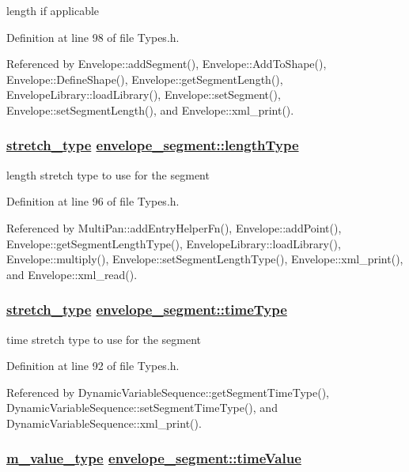 length if applicable 



Definition at line 98 of file Types.h.

Referenced by Envelope::add\-Segment(), Envelope::Add\-To\-Shape(), Envelope::Define\-Shape(), Envelope::get\-Segment\-Length(), Envelope\-Library::load\-Library(), Envelope::set\-Segment(), Envelope::set\-Segment\-Length(), and Envelope::xml\_\-print().\hypertarget{structenvelope__segment_o3}{
\subsubsection[lengthType]{\setlength{\rightskip}{0pt plus 5cm}\hyperlink{Types_8h_a12}{stretch\_\-type} \hyperlink{structenvelope__segment_o3}{envelope\_\-segment::length\-Type}}}
\label{structenvelope__segment_o3}


length stretch type to use for the segment 



Definition at line 96 of file Types.h.

Referenced by Multi\-Pan::add\-Entry\-Helper\-Fn(), Envelope::add\-Point(), Envelope::get\-Segment\-Length\-Type(), Envelope\-Library::load\-Library(), Envelope::multiply(), Envelope::set\-Segment\-Length\-Type(), Envelope::xml\_\-print(), and Envelope::xml\_\-read().\hypertarget{structenvelope__segment_o1}{
\subsubsection[timeType]{\setlength{\rightskip}{0pt plus 5cm}\hyperlink{Types_8h_a12}{stretch\_\-type} \hyperlink{structenvelope__segment_o1}{envelope\_\-segment::time\-Type}}}
\label{structenvelope__segment_o1}


time stretch type to use for the segment 



Definition at line 92 of file Types.h.

Referenced by Dynamic\-Variable\-Sequence::get\-Segment\-Time\-Type(), Dynamic\-Variable\-Sequence::set\-Segment\-Time\-Type(), and Dynamic\-Variable\-Sequence::xml\_\-print().\hypertarget{structenvelope__segment_o2}{
\subsubsection[timeValue]{\setlength{\rightskip}{0pt plus 5cm}\hyperlink{Types_8h_a3}{m\_\-value\_\-type} \hyperlink{structenvelope__segment_o2}{envelope\_\-segment::time\-Value}}}
\label{structenvelope__segment_o2}


